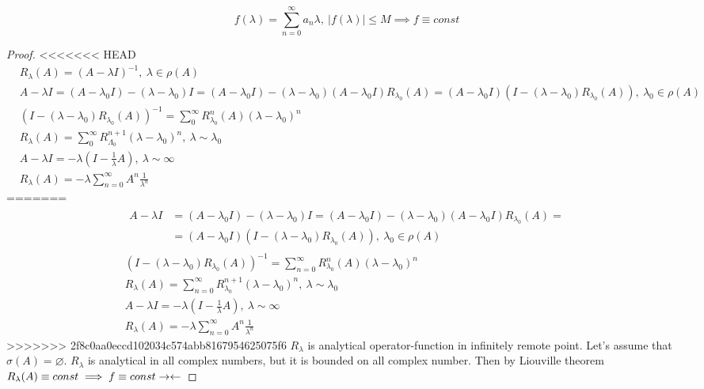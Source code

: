 \begin{thm}[Liouville]
  \[
    f(\lambda) = \sum_{n = 0}^\infty a_n \lambda,\ 
    |f(\lambda)| \leq M \implies f \equiv const
  \]
\end{thm}

\begin{proof}
<<<<<<< HEAD
  \begin{align*}
    &R_\lambda(A) = (A - \lambda I)^{-1},\ \lambda \in \rho(A) \\
    &A - \lambda I = (A - \lambda_0 I) - (\lambda - \lambda_0) I  = (A - \lambda_0 I) - (\lambda - \lambda_0) (A - \lambda_0 I) R_{\lambda_0}(A) = (A - \lambda_0 I)(I - (\lambda - \lambda_0)R_{\lambda_0}(A)),\ \lambda_0 \in \rho(A)\\ 
    &(I - (\lambda - \lambda_0) R_{\lambda_0}(A))^{-1} = \sum_0^\infty R_{\lambda_0}^n(A)(\lambda - \lambda_0)^n \\
    &R_\lambda(A) = \sum_0^\infty R_{\Lambda_0}^{n + 1} (\lambda - \lambda_0)^n,\ \lambda \sim \lambda_0 \\
    &A - \lambda I = -\lambda(I - \frac 1\lambda A),\ \lambda \sim \infty \\
    &R_\lambda(A) = -\lambda \sum_{n = 0}^\infty A^n \frac{1}{\lambda^n}
  \end{align*}
=======
  \begin{gather*}
    \begin{split}
      A - \lambda I & = (A - \lambda_0 I) - (\lambda - \lambda_0) I = (A - \lambda_0 I) - (\lambda - \lambda_0) (A - \lambda_0 I) R_{\lambda_0}(A) = {}\\
                    & = (A - \lambda_0 I)(I - (\lambda - \lambda_0)R_{\lambda_0}(A)),\ \lambda_0 \in \rho(A) 
    \end{split} \\
    (I - (\lambda - \lambda_0) R_{\lambda_0}(A))^{-1} = \sum_{n=0}^\infty R_{\lambda_0}^n(A)(\lambda - \lambda_0)^n \\
    R_\lambda(A)  = \sum_{n=0}^\infty R_{\lambda_0}^{n + 1} (\lambda - \lambda_0)^n,\ \lambda \sim \lambda_0 \\
    A - \lambda I = -\lambda(I - \tfrac 1\lambda A),\ \lambda \sim \infty \\
    R_\lambda(A)  = -\lambda \sum_{n = 0}^\infty A^n \frac{1}{\lambda^n}
  \end{gather*}
>>>>>>> 2f8c0aa0eccd102034c574abb8167954625075f6
  $R_\lambda$ is analytical operator-function in infinitely remote point.
  Let's assume that $\sigma(A) = \varnothing$. 
  $R_\lambda$ is analytical in all complex numbers, but it is bounded on all
  complex number. Then by Liouville theorem $R_\lambda(A) \equiv const \implies
  f \equiv const \rightarrow\leftarrow$
\end{proof}
